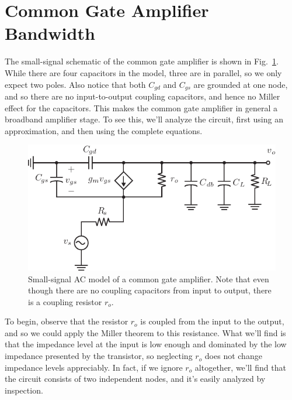 \section{Common Gate Amplifier Bandwidth}

The small-signal schematic of the common gate amplifier is shown in Fig.~\ref{fig:cg_amp_caps}. While there are four capacitors in the model, three are in parallel, so we only expect two poles.  Also notice that both $C_{gd}$ and $C_{gs}$ are grounded at one node, and so there are no input-to-output coupling capacitors, and hence no Miller effect for the capacitors.  This makes the common gate amplifier in general a broadband amplifier stage.  To see this, we'll analyze the circuit, first using an approximation, and then using the complete equations.  

\begin{figure}[tb]
\begin{center}
\includegraphics[scale=1]{amp_cg_ss}
\end{center}
\caption{Small-signal AC model of a common gate amplifier.  Note that even though there are no coupling capacitors from input to output, there is a coupling resistor $r_o$.} \label{fig:cg_amp_caps}
\end{figure}


To begin, observe that the resistor $r_o$ is coupled from the input to the output, and so we could apply the Miller theorem to this resistance.  What we'll find is that the impedance level at the input is low enough and dominated by the low impedance presented by the transistor, so neglecting $r_o$ does not change impedance levels appreciably.  In fact, if we ignore $r_o$ altogether, we'll find that the circuit consists of two independent nodes, and it's easily analyzed by inspection.

